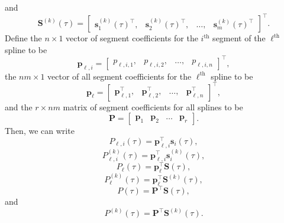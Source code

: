 and
\begin{equation}
	\mathbf{S}^{(k)}(\tau) = 
	\begin{bmatrix} 
		\mathbf{s}_1^{(k)}(\tau)^\top, &
		\mathbf{s}_2^{(k)}(\tau)^\top, &
		\dots, &
		\mathbf{s}_m^{(k)}(\tau)^\top
	\end{bmatrix}^\top.
\end{equation}
Define the $n\times 1$ vector of segment coefficients for the $i^{\text{th}}$ segment of the $\ell^\text{th}$ spline to be
\begin{equation}
	\mathbf{p}_{\ell, i} = 
	\begin{bmatrix}
		p_{\ell, i, 1},& p_{\ell, i, 2},& \dots,& p_{\ell, i, n}
	\end{bmatrix}^\top,
\end{equation}
the $n m \times 1$ vector of all segment coefficients for the $\ell^\text{th}$ spline to be
\begin{equation}
	\mathbf{p}_{\ell} = 
	\begin{bmatrix}
	\mathbf{p}_{\ell, 1}^\top,& \mathbf{p}_{\ell, 2}^\top,& \dots,& \mathbf{p}_{\ell, n}^\top 
\end{bmatrix}^\top,
\end{equation}
and the $r \times n m$ matrix of segment coefficients for all splines to be 
\begin{equation}
	\mathbf{P} = 
	\begin{bmatrix} 
		\mathbf{p}_{1} &
		\mathbf{p}_{2} &
		\dots &
		\mathbf{p}_{r}
	\end{bmatrix}.
\end{equation}
Then, we can write 
\begin{equation}
	P_{\ell, i}(\tau) = \mathbf{p}_{\ell, i}^\top \mathbf{s}_i(\tau),
\end{equation}
\begin{equation}
	P_{\ell, i}^{(k)}(\tau) = \mathbf{p}_{\ell, i}^\top \mathbf{s}_i^{(k)}(\tau),
\end{equation}
\begin{equation}
	P_\ell(\tau) = \mathbf{p}_\ell^\top \mathbf{S}(\tau),
\end{equation}
\begin{equation}
	P_\ell^{(k)}(\tau) = \mathbf{p}_\ell^\top \mathbf{S}^{(k)}(\tau),
\end{equation}
\begin{equation}
	P(\tau) = \mathbf{P}^\top \mathbf{S}(\tau),
\end{equation}
and
\begin{equation}
	P^{(k)}(\tau) = \mathbf{P}^\top \mathbf{S}^{(k)}(\tau).
\end{equation}

